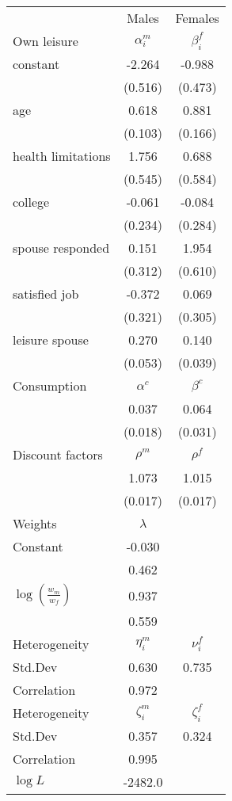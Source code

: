 \begin{tabular}{lcc} 
\hline\hline 
 & Males & Females \\ 
Own leisure & $\alpha_{i}^{m}$ & $\beta_{i}^{f}$ \\ 
constant & -2.264 & -0.988 \\ 
 & (0.516) & (0.473) \\ 
age & 0.618 & 0.881 \\ 
 & (0.103) & (0.166) \\ 
health limitations & 1.756 & 0.688 \\ 
 & (0.545) & (0.584) \\ 
college & -0.061 & -0.084 \\ 
 & (0.234) & (0.284) \\ 
spouse responded & 0.151 & 1.954 \\ 
 & (0.312) & (0.610) \\ 
satisfied job & -0.372 & 0.069 \\ 
 & (0.321) & (0.305) \\ 
leisure spouse & 0.270 & 0.140 \\ 
 & (0.053) & (0.039) \\ 
Consumption & $\alpha^{c}$ & $\beta^{c}$ \\ 
 & 0.037 & 0.064 \\ 
 & (0.018) & (0.031) \\ 
Discount factors & $\rho^m$ & $\rho^f$ \\ 
 & 1.073 & 1.015 \\ 
 & (0.017) & (0.017) \\ 
Weights & $\lambda$ &  \\ 
Constant & -0.030 &  \\ 
 & 0.462 &  \\ 
$\log(\frac{w_m}{w_f})$ & 0.937 &  \\ 
 & 0.559 &  \\ 
Heterogeneity & $\eta_i^m$ & $\nu_i^f$ \\ 
Std.Dev & 0.630 & 0.735 \\ 
Correlation & 0.972 &  \\ 
Heterogeneity & $\zeta_i^m$ & $\zeta_i^f$ \\ 
Std.Dev & 0.357 & 0.324 \\ 
Correlation & 0.995 &  \\ 
\hline 
$\log L$ & -2482.0 & \\ 
\hline \hline 
\end{tabular} 
